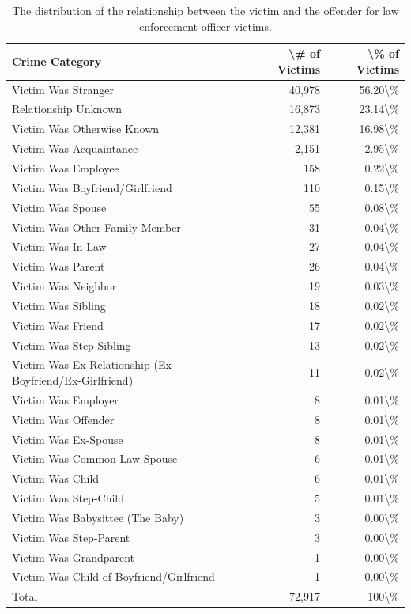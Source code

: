 \documentclass[
  12pt,
  openany]{book}
\begin{document}
\begin{longtable}[t]{lrr}
\caption{\label{tab:victimRelationshipPolice}The distribution of the relationship between the victim and the offender for law enforcement officer victims.}\\
\toprule
Crime Category & \textbackslash{}\# of Victims & \textbackslash{}\% of Victims\\
\midrule
Victim Was Stranger & 40,978 & 56.20\textbackslash{}\%\\
Relationship Unknown & 16,873 & 23.14\textbackslash{}\%\\
Victim Was Otherwise Known & 12,381 & 16.98\textbackslash{}\%\\
Victim Was Acquaintance & 2,151 & 2.95\textbackslash{}\%\\
Victim Was Employee & 158 & 0.22\textbackslash{}\%\\
\addlinespace
Victim Was Boyfriend/Girlfriend & 110 & 0.15\textbackslash{}\%\\
Victim Was Spouse & 55 & 0.08\textbackslash{}\%\\
Victim Was Other Family Member & 31 & 0.04\textbackslash{}\%\\
Victim Was In-Law & 27 & 0.04\textbackslash{}\%\\
Victim Was Parent & 26 & 0.04\textbackslash{}\%\\
\addlinespace
Victim Was Neighbor & 19 & 0.03\textbackslash{}\%\\
Victim Was Sibling & 18 & 0.02\textbackslash{}\%\\
Victim Was Friend & 17 & 0.02\textbackslash{}\%\\
Victim Was Step-Sibling & 13 & 0.02\textbackslash{}\%\\
Victim Was Ex-Relationship (Ex-Boyfriend/Ex-Girlfriend) & 11 & 0.02\textbackslash{}\%\\
\addlinespace
Victim Was Employer & 8 & 0.01\textbackslash{}\%\\
Victim Was Offender & 8 & 0.01\textbackslash{}\%\\
Victim Was Ex-Spouse & 8 & 0.01\textbackslash{}\%\\
Victim Was Common-Law Spouse & 6 & 0.01\textbackslash{}\%\\
Victim Was Child & 6 & 0.01\textbackslash{}\%\\
\addlinespace
Victim Was Step-Child & 5 & 0.01\textbackslash{}\%\\
Victim Was Babysittee (The Baby) & 3 & 0.00\textbackslash{}\%\\
Victim Was Step-Parent & 3 & 0.00\textbackslash{}\%\\
Victim Was Grandparent & 1 & 0.00\textbackslash{}\%\\
Victim Was Child of Boyfriend/Girlfriend & 1 & 0.00\textbackslash{}\%\\
\addlinespace
Total & 72,917 & 100\textbackslash{}\%\\
\bottomrule
\end{longtable}
\end{document}
